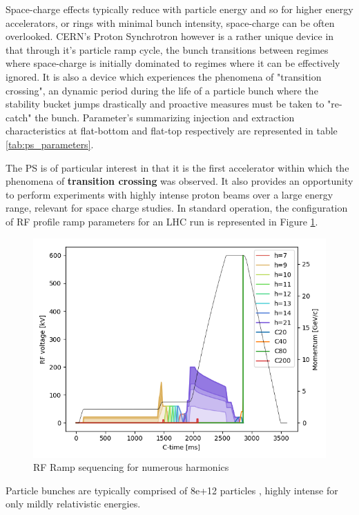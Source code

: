 Space-charge effects typically reduce with particle energy and so for higher energy accelerators, or rings with minimal bunch intensity, space-charge can be often overlooked. CERN's Proton Synchrotron however is a rather unique device in that through it's particle ramp cycle, the bunch transitions between regimes where space-charge is initially dominated to regimes where it can be effectively ignored. It is also a device which experiences the phenomena of "transition crossing", an dynamic period during the life of a particle bunch where the stability bucket jumps drastically and proactive measures must be taken to "re-catch" the bunch. Parameter's summarizing injection and extraction characteristics at flat-bottom and flat-top respectively are represented in table \ref{tab:ps_parameters}.



The PS is of particular interest in that it is the first accelerator within which the phenomena of \textbf{transition crossing} was observed. It also provides an opportunity to perform experiments with highly intense proton beams over a large energy range, relevant for space charge studies. In standard operation, the configuration of RF profile ramp parameters for an LHC run is represented in Figure \ref{fig:ps_ramp}.

\begin{figure}
    \centering
    \includegraphics{figs/RF.png}
    \caption{RF Ramp sequencing for numerous harmonics}
    \label{fig:ps_ramp}
\end{figure}

Particle bunches are typically comprised of 8e+12 particles \cite{migliorati_instability_2018}, highly intense for only mildly relativistic energies.

